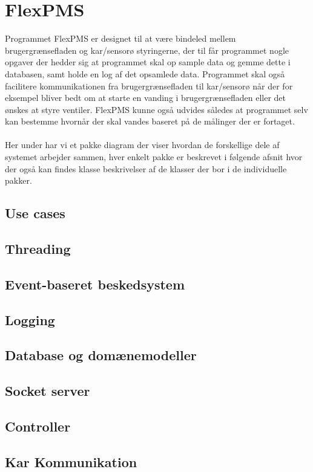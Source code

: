 \section{FlexPMS}
Programmet FlexPMS er designet til at være bindeled mellem brugergrænsefladen og kar/sensorø styringerne, der til får programmet nogle opgaver der hedder sig at programmet skal op sample data og gemme dette i databasen, samt holde en log af det opsamlede data. Programmet skal også facilitere kommunikationen fra brugergrænsefladen til kar/sensorø når der for eksempel bliver bedt om at starte en vanding i brugergrænsefladen eller det ønskes at styre ventiler. FlexPMS kunne også udvides således at programmet selv kan bestemme hvornår der skal vandes baseret på de målinger der er fortaget.\\\\

Her under har vi et pakke diagram der viser hvordan de forskellige dele af systemet arbejder sammen, hver enkelt pakke er beskrevet i følgende afsnit hvor der også kan findes klasse beskrivelser af de klasser der bor i de individuelle pakker.


\subsection{Use cases}


\subsection{Threading}


\subsection{Event-baseret beskedsystem}


\subsection{Logging}


\subsection{Database og domænemodeller}


\subsection{Socket server}


\subsection{Controller}


\subsection{Kar Kommunikation}

